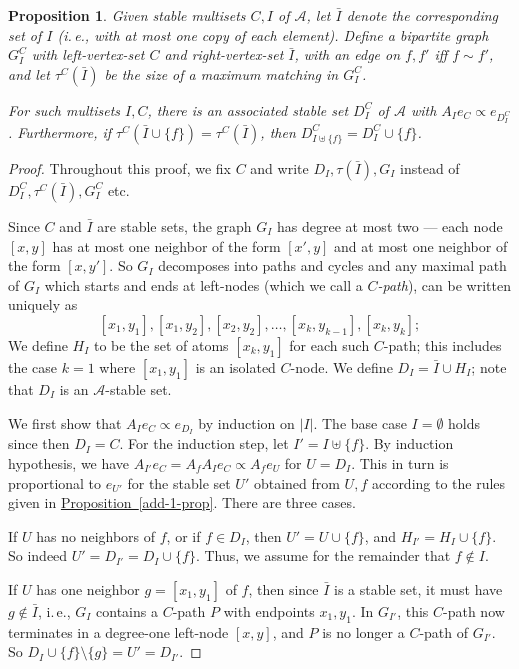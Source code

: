 \documentclass[11pt]{article}
\newcommand{\expref}[2]{\texorpdfstring{\hyperref[#2]{#1~\ref{#2}}}{#1~\ref{#2}}}
\newtheorem{proposition}[theorem]{Proposition}
\newcommand{\ie}{i.\,e.}
\begin{document}
\begin{proposition}
\label{add-active-prop}
Given stable multisets $C, I$ of $\mathcal A$, let $\bar I$ denote the corresponding set of $I$ (\ie, with at most one copy of each element).  Define a bipartite graph $G^C_{I}$ with left-vertex-set $C$ and right-vertex-set  $\bar I$, with an edge on $f, f'$ iff $f \sim f'$, and let $\tau^{C}(\bar I)$ be the size of a maximum matching in $G^C_{I}$.   

For such multisets $I, C$, there is an associated stable set $D^C_{I}$ of $\mathcal A$ with  $A_I e_C \propto e_{D^C_{I}}$. Furthermore, if $\tau^C(\bar I \cup \{f \}) = \tau^C(\bar I)$, then $D^C_{I \uplus \{f \}} = D^C_{I} \cup \{ f \}$.
\end{proposition}
\begin{proof}
Throughout this proof, we fix $C$ and write $D_I, \tau(\bar I), G_I$ instead of $D^C_{I}, \tau^C(\bar I), G^C_{I}$ etc.

Since $C$ and $\bar I$ are stable sets, the graph $G_{I}$ has degree at most two ---  each node $[x,y]$ has at most one neighbor of the form $[x', y]$ and at most one neighbor of the form $[x, y']$. So $G_{I}$ decomposes into paths and cycles and any maximal path of $G_I$ which starts and ends at left-nodes (which we call a \emph{$C$-path}), can be written uniquely as
$$
[x_1, y_1], [x_1, y_2], [x_2, y_2], \dots, [x_k, y_{k-1}], [x_k, y_k];
$$
We define $H_I$ to be the set of atoms $[x_k, y_1]$ for each such $C$-path; this includes the case $k = 1$ where $[x_1, y_1]$ is an isolated $C$-node. We define $D_I = \bar I \cup H_I$; note that $D_I$ is an $\mathcal A$-stable set.

We first show that $A_I e_C \propto e_{D_{I}}$ by  induction on $|I|$. The base case $I =\emptyset$ holds since then $D_{I} = C$. For the induction step, let $I' = I \uplus \{f \}$. By induction hypothesis, we have $A_{I'} e_C = A_f A_{I} e_C \propto A_f e_{U}$ for $U = D_{I}$. This in turn is proportional to $e_{ U' }$ for the stable set $U'$ obtained from $U, f$ according to the rules given in \expref{Proposition}{add-1-prop}. There are three cases.

 If $U$ has no neighbors of $f$, or if $f \in D_I$, then $U' = U \cup \{f \}$,  and $H_{I'} = H_{I} \cup \{f \}$. So indeed $U' =  D_{I'} = D_I \cup \{ f \}$. Thus, we assume for the remainder that $f \notin I$.

 If $U$ has one neighbor $g = [x_1, y_1]$ of $f$, then since $\bar I$ is a stable set, it must have $g \notin \bar I$, \ie, $G_{I}$ contains a $C$-path $P$ with endpoints $x_1, y_1$. In $G_{I'}$, this $C$-path now terminates in a degree-one left-node $[x, y]$, and $P$ is no longer a $C$-path of $G_{I'}$. So $D_{I} \cup \{f \} \setminus \{ g \} = U' = D_{I'}$.


\end{proof}
\end{document}
